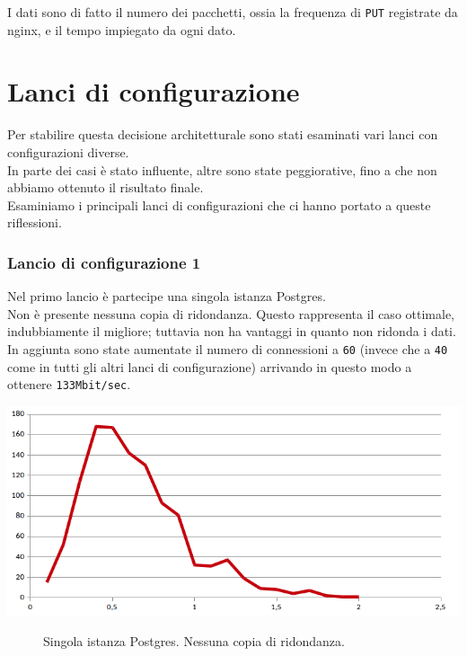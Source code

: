 I dati sono di fatto il numero dei pacchetti, ossia la frequenza di \verb"PUT" registrate da nginx, e il tempo impiegato da ogni dato.

\item
\section{Lanci di configurazione}
Per stabilire questa decisione architetturale sono stati esaminati vari lanci con configurazioni diverse.\\
In parte dei casi \`{e} stato influente, altre sono state peggiorative, fino a che non abbiamo ottenuto il risultato finale.\\ 
Esaminiamo i principali lanci di configurazioni che ci hanno portato a queste riflessioni.

\item
\subsubsection{Lancio di configurazione 1} 
Nel primo lancio \`{e} partecipe una singola istanza Postgres. \\
Non \`{e} presente nessuna copia di ridondanza. Questo rappresenta il caso ottimale, indubbiamente il migliore; tuttavia non ha vantaggi in quanto non ridonda i dati.\\
In aggiunta sono state aumentate il numero di connessioni a \verb"60" (invece che a \verb"40" come in tutti gli altri lanci di configurazione) arrivando in questo modo a ottenere \verb"133Mbit/sec".

\begin{center}
\includegraphics[scale=0.70]{img/round2.png}
\end{center}
\begin{figure}[htbp]
\caption{Singola istanza Postgres. Nessuna copia di ridondanza. \label{figura1.15}}
\end{figure}


